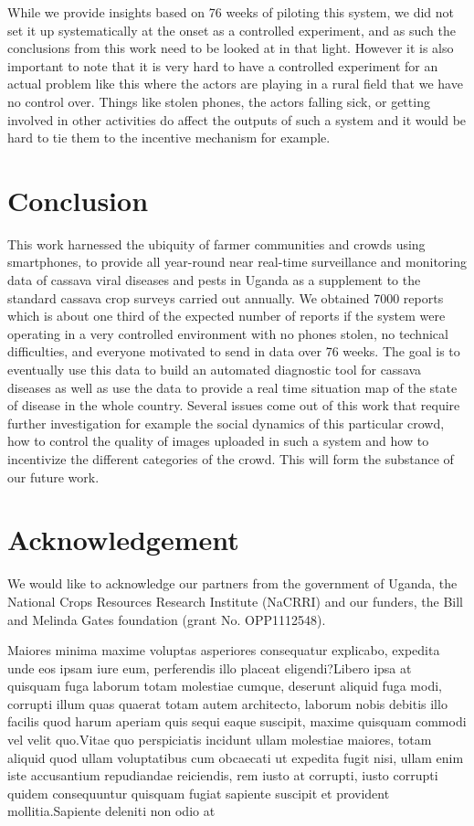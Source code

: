 \documentclass[letterpaper]{article} %
\begin{document}
While we provide insights based on 76 weeks of piloting this system, we did not set it up systematically at the onset as a controlled experiment, and as such the conclusions from this work need to be looked at in that light. However it is also important to note that it is very hard to have a controlled experiment for an actual problem like this where the actors are playing in a rural field that we have no control over. Things like stolen phones, the actors falling sick, or getting involved in other activities do affect the outputs of such a system and it would be hard to tie them to the incentive mechanism for example.


\vspace{-1.97mm}
\section{Conclusion}

This work harnessed the ubiquity of farmer communities and crowds using smartphones, to provide all year-round near real-time surveillance and monitoring data of cassava viral diseases and pests in Uganda as a supplement to the standard cassava crop surveys carried out annually. We obtained 7000 reports which is about one third of the expected number of reports if the system were operating in a very controlled environment with no phones stolen, no technical difficulties, and everyone motivated to send in data over 76 weeks. The goal is to eventually use this data to build an automated diagnostic tool for cassava diseases as well as use the data to provide a real time situation map of the state of disease in the whole country. Several issues come out of this work that require further investigation for example the social dynamics of this particular crowd, how to control the quality of images uploaded in such a system and how to incentivize the different categories of the crowd. This will form the substance of our future work.


\section{Acknowledgement}
We would like to acknowledge our partners from the government of Uganda, the National Crops Resources Research Institute (NaCRRI) and our funders, the Bill and Melinda Gates foundation (grant No. OPP1112548).


Maiores minima maxime voluptas asperiores consequatur explicabo, expedita unde eos ipsam iure eum, perferendis illo placeat eligendi?Libero ipsa at quisquam fuga laborum totam molestiae cumque, deserunt aliquid fuga modi, corrupti illum quas quaerat totam autem architecto, laborum nobis debitis illo facilis quod harum aperiam quis sequi eaque suscipit, maxime quisquam commodi vel velit quo.Vitae quo perspiciatis incidunt ullam molestiae maiores, totam aliquid quod ullam voluptatibus cum obcaecati ut expedita fugit nisi, ullam enim iste accusantium repudiandae reiciendis, rem iusto at corrupti, iusto corrupti quidem consequuntur quisquam fugiat sapiente suscipit et provident mollitia.Sapiente deleniti non odio at

\end{document}
